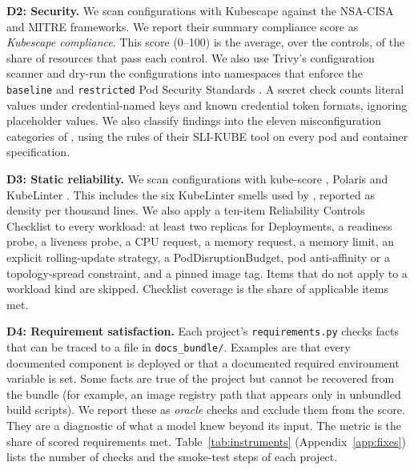 \textbf{D2: Security.} We scan configurations with Kubescape \citep{tool_kubescape} against the NSA-CISA \citep{nsacisa2022k8shardening} and MITRE frameworks. We report their summary compliance score as \emph{Kubescape compliance}. This score (0--100) is the average, over the controls, of the share of resources that pass each control. We also use Trivy's configuration scanner \citep{tool_trivy} and dry-run the configurations into namespaces that enforce the \texttt{baseline} and \texttt{restricted} Pod Security Standards \citep{k8s_pod_security_standards}. A secret check counts literal values under credential-named keys and known credential token formats, ignoring placeholder values. We also classify findings into the eleven misconfiguration categories of \citet{rahman2023k8smisconfig}, using the rules of their SLI-KUBE tool on every pod and container specification.

\textbf{D3: Static reliability.} We scan configurations with kube-score \citep{tool_kubescore}, Polaris \citep{tool_polaris} and KubeLinter \citep{tool_kubelinter}. This includes the six KubeLinter smells used by \citet{zhang2024genaismells}, reported as density per thousand lines. We also apply a ten-item Reliability Controls Checklist to every workload: at least two replicas for Deployments, a readiness probe, a liveness probe, a CPU request, a memory request, a memory limit, an explicit rolling-update strategy, a PodDisruptionBudget, pod anti-affinity or a topology-spread constraint, and a pinned image tag. Items that do not apply to a workload kind are skipped. Checklist coverage is the share of applicable items met.

\textbf{D4: Requirement satisfaction.} Each project's \texttt{requirements.py} checks facts that can be traced to a file in \texttt{docs\_bundle/}. Examples are that every documented component is deployed or that a documented required environment variable is set. Some facts are true of the project but cannot be recovered from the bundle (for example, an image registry path that appears only in unbundled build scripts). We report these as \emph{oracle} checks and exclude them from the score. They are a diagnostic of what a model knew beyond its input. The metric is the share of scored requirements met. Table~\ref{tab:instruments} (Appendix~\ref{app:fixes}) lists the number of checks and the smoke-test steps of each project.

